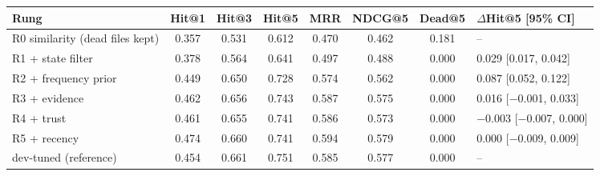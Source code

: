 \begin{tabular}{lcccccc l}
\toprule
Rung & Hit@1 & Hit@3 & Hit@5 & MRR & NDCG@5 & Dead@5 & $\Delta$Hit@5 [95\% CI] \\
\midrule
R0 similarity (dead files kept) & 0.357 & 0.531 & 0.612 & 0.470 & 0.462 & 0.181 & -- \\
R1 + state filter & 0.378 & 0.564 & 0.641 & 0.497 & 0.488 & 0.000 & 0.029 [0.017, 0.042] \\
R2 + frequency prior & 0.449 & 0.650 & 0.728 & 0.574 & 0.562 & 0.000 & 0.087 [0.052, 0.122] \\
R3 + evidence & 0.462 & 0.656 & 0.743 & 0.587 & 0.575 & 0.000 & 0.016 [$-$0.001, 0.033] \\
R4 + trust & 0.461 & 0.655 & 0.741 & 0.586 & 0.573 & 0.000 & $-$0.003 [$-$0.007, 0.000] \\
R5 + recency & 0.474 & 0.660 & 0.741 & 0.594 & 0.579 & 0.000 & 0.000 [$-$0.009, 0.009] \\
\midrule
\sys{} dev-tuned (reference) & 0.454 & 0.661 & 0.751 & 0.585 & 0.577 & 0.000 & -- \\
\bottomrule
\end{tabular}